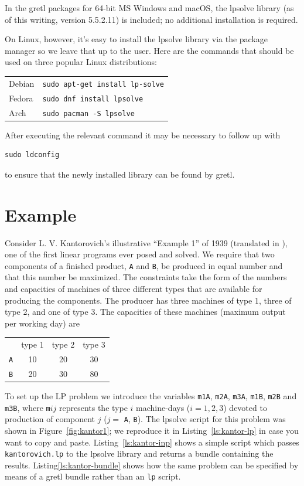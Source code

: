 \documentclass{article}
\begin{document}
In the gretl packages for 64-bit MS Windows and macOS, the
\textsf{lpsolve} library (as of this writing, version 5.5.2.11) is
included; no additional installation is required.

On Linux, however, it's easy to install the \textsf{lpsolve} library
via the package manager so we leave that up to the user. Here are the
commands that should be used on three popular Linux distributions:
\begin{center}
  \begin{tabular}{ll}
  Debian & \texttt{sudo apt-get install lp-solve} \\
  Fedora & \texttt{sudo dnf install lpsolve} \\
  Arch & \texttt{sudo pacman -S lpsolve}
\end{tabular}
\end{center}
After executing the relevant command it may be necessary to follow up
with
\begin{verbatim}
sudo ldconfig
\end{verbatim}
to ensure that the newly installed library can be found by gretl.

\section{Example}
\label{sec:example}

Consider L. V. Kantorovich's illustrative ``Example 1'' of 1939
(translated in \cite{kantorovich60}), one of the first linear programs
ever posed and solved. We require that two components of a finished
product, \texttt{A} and \texttt{B}, be produced in equal number and
that this number be maximized. The constraints take the form of the
numbers and capacities of machines of three different types that are
available for producing the components. The producer has three
machines of type 1, three of type 2, and one of type 3. The capacities
of these machines (maximum output per working day) are

\begin{center}
\begin{tabular}{cccc}
  & type 1 & type 2 & type 3 \\
  \texttt{A} & 10 & 20 & 30 \\
  \texttt{B} & 20 & 30 & 80 
\end{tabular}
\end{center}

To set up the LP problem we introduce the variables \texttt{m1A},
\texttt{m2A}, \texttt{m3A}, \texttt{m1B}, \texttt{m2B} and
\texttt{m3B}, where \texttt{m}$ij$ represents the type $i$
machine-days ($i=1,2,3$) devoted to production of component $j$ ($j=$
\texttt{A}, \texttt{B}).  The \textsf{lpsolve} script for this problem
was shown in Figure~\ref{fig:kantor1}; we reproduce it in
Listing~\ref{ls:kantor-lp} in case you want to copy and
paste. Listing~\ref{ls:kantor-inp} shows a simple script which passes
\texttt{kantorovich.lp} to the \textsf{lpsolve} library and returns a
bundle containing the results. Listing\ref{ls:kantor-bundle} shows how
the same problem can be specified by means of a gretl bundle rather
than an \texttt{lp} script.
\end{document}
